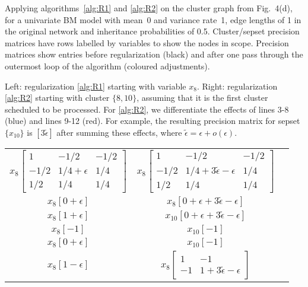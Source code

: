 \documentclass{article}
\begin{document}
Applying algorithms~\ref{alg:R1} and \ref{alg:R2} on the cluster graph from Fig.~4(d), for a univariate BM model with mean~0 and variance rate~1, edge lengths of 1 in the original network and inheritance probabilities of 0.5. Cluster/sepset precision matrices have rows labelled by variables to show the nodes in scope. Precision matrices show entries before regularization (black) and after one pass through the outermost loop of the algorithm (coloured adjustments).

Left: regularization \ref{alg:R1} starting with variable $x_8$. Right: regularization \ref{alg:R2} starting with cluster $\{8, 10\}$, assuming that it is the first cluster scheduled to be processed. For \ref{alg:R2}, we differentiate the effects of lines 3-8 (blue) and lines 9-12 (red). For example, the resulting precision matrix for sepset $\{x_{10}\}$ is $[3\tilde{\epsilon}]$ after summing these effects, where $\tilde{\epsilon}=\epsilon+o(\epsilon)$.

\begin{center}
\begin{tabular}{c c c}
$x_8 \left[\begin{array}{ccc}
1 & -1/2 & -1/2 \\
-1/2 & 1/4+\epsilon & 1/4 \\
1/2 & 1/4 & 1/4
\end{array}\right]$ &
$x_{8} \left[\begin{array}{ccc}
1 & -1/2 & -1/2 \\
-1/2 & 1/4+3\tilde{\epsilon}-\epsilon & 1/4 \\
1/2 & 1/4 & 1/4
\end{array}\right]$ \\
$x_8 [0+\epsilon]$ &
$x_8 [0+\epsilon+3\tilde{\epsilon}-\epsilon]$ \\
$x_8 [1+\epsilon]$ &
$x_{10}[0+\epsilon+3\tilde{\epsilon}-\epsilon]$ \\
$x_8[-1]$ &
$x_{10}[-1]$ \\
$x_8 [0+\epsilon]$ &
$x_{10}[-1]$ \\
$x_8 [1-\epsilon]$ &
$x_{8} \left[\begin{array}{cc}
1 & -1 \\
-1 & 1+3\tilde{\epsilon}-\epsilon
\end{array}\right]$
\end{tabular}
\end{center}
\end{document}

